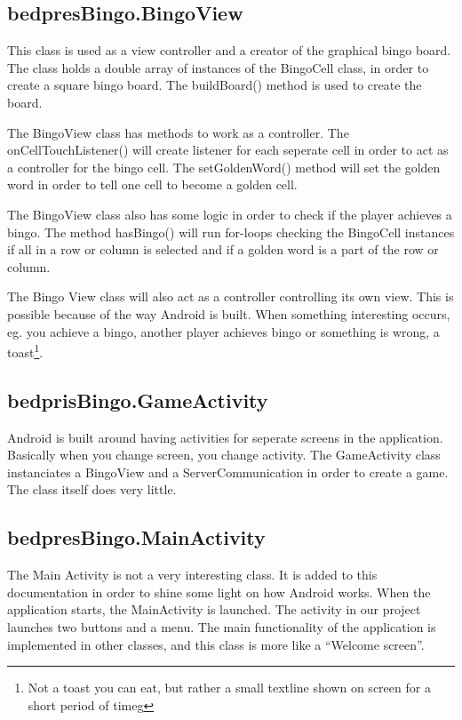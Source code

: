 \subsection{bedpresBingo.BingoView}
This class is used as a view controller and a creator of the graphical bingo board. The class holds a double array of instances of the BingoCell class, in order to create a square bingo board. The buildBoard() method is used to create the board. 

The BingoView class has methods to work as a controller. The onCellTouchListener() will create listener for each seperate cell in order to act as a controller for the bingo cell. The setGoldenWord() method will set the golden word in order to tell one cell to become a golden cell. 

The BingoView class also has some logic in order to check if the player achieves a bingo. The method hasBingo() will run for-loops checking the BingoCell instances if all in a row or column is selected and if a golden word is a part of the row or column.

The Bingo View class will also act as a controller controlling its own view. This is possible because of the way Android is built. When something interesting occurs, eg. you achieve a bingo, another player achieves bingo or something is wrong, a toast\footnote[1]{Not a toast you can eat, but rather a small textline shown on screen for a short period of timeg}. 


\subsection{bedprisBingo.GameActivity}
Android is built around having activities for seperate screens in the application. Basically when you change screen, you change activity. The GameActivity class instanciates a BingoView and a ServerCommunication in order to create a game. The class itself does very little.


\subsection{bedpresBingo.MainActivity}
The Main Activity is not a very interesting class. It is added to this documentation in order to shine some light on how Android works. When the application starts, the MainActivity is launched. The activity in our project launches two buttons and a menu. The main functionality of the application is implemented in other classes, and this class is more like a ``Welcome screen''. 


